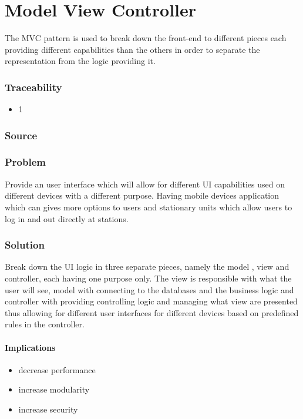 
\section{Model View Controller}
	The MVC pattern is used to break down the front-end to different pieces each providing different capabilities than the others in order to separate the representation from the logic providing it.

	\subsubsection{Traceability} 
		\begin{itemize}
			\item 1
		\end{itemize}

	\subsubsection{Source} \cite{book:design-patterns}


	\subsubsection{Problem}

		Provide an user interface which will allow for different UI capabilities used on different devices with a different purpose. Having mobile devices application which can gives more options to users and stationary units which allow users to log in and out directly at stations.

	\subsubsection{Solution} 

		Break down the UI logic in three separate pieces, namely the model , view and controller, each having one purpose only. The view is responsible with what the user will see, model with connecting to the databases and the business logic and controller with providing controlling logic and managing what view are presented thus allowing for different user interfaces for different devices based on predefined rules in the controller. 


\paragraph{Implications}
\begin{itemize}
	\item decrease performance
	\item increase modularity
	\item increase security
\end{itemize}
